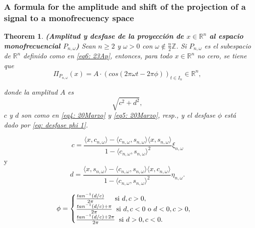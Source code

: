 \documentclass[]{beamer}
\newtheorem{teo}{\bf Theorem}
\theoremstyle{definition}
\newcommand{\IR}{\mathbb{R}}
\newcommand{\IZ}{\mathbb{Z}}
\begin{document}
\begin{frame}
\frametitle{A formula for the amplitude and shift of the projection of a signal to a monofrecuency space}
\begin{teo}
\label{teo: amelie1}
\textbf{(Amplitud y desfase de la proyección de $x \in \IR^{n}$ al
espacio monofrecuencial $P_{n, \omega}$)}
Sean $n \geq 2$ y $\omega > 0$ con $\omega \not\in \frac{n}{2}\IZ$.
Si $P_{n, \omega}$ es el subespacio de $\IR^{n}$ definido como 
en \eqref{eq6: 23Ap}, entonces, para todo 
$x \in \IR^{n}$ no cero, se tiene que
\begin{equation}
\label{ec: desfase explicito 1}
\Pi_{P_{n, \omega}} (x) = A \cdot (
cos (2 \pi \omega t - 2 \pi \phi)
)_{t \in I_{n}} \in \IR^{n},
\end{equation}

\noindent
donde la amplitud $A$ es
\[
\sqrt{c^{2}+d^{2}},
\]
$c$ y $d$ son como en \eqref{eq4: 20Marzo} y 
\eqref{eq5: 20Marzo}, resp., y el desfase $\phi$ está 
dado por \eqref{eq: desfase phi 1}.
\end{teo}
\end{frame}

\begin{frame}
\begin{equation}
\label{eq4: 20Marzo}
c= \frac{
\langle x, c_{n, \omega} \rangle - \langle c_{n, \omega}, s_{n, \omega} \rangle
\langle x, s_{n, \omega} \rangle
}{1-\langle c_{n, \omega}, s_{n, \omega} \rangle^{2}} \xi_{n, \omega}
\end{equation}
y
\begin{equation}
\label{eq5: 20Marzo}
d= \frac{
\langle x, s_{n, \omega} \rangle - \langle c_{n, \omega}, s_{n, \omega} \rangle
\langle x, c_{n, \omega} \rangle
}{1-\langle c_{n, \omega}, s_{n, \omega} \rangle^{2}} \eta_{n, \omega}.
\end{equation}
\end{frame}

\begin{frame}
\begin{equation}
\label{eq: desfase phi 1}
\phi =
\begin{cases}
\frac{tan^{-1}(d/c) }{2 \pi}  \hspace{0.4cm}    \text{   si }   d, c > 0,  \\
\frac{tan^{-1}(d/c) + \pi }{2 \pi} \hspace{0.2cm}  \text{si }  d, c < 0
\text{ o } d<0, c>0, \\
\frac{tan^{-1}(d/c) + 2\pi }{2 \pi} \hspace{0.2cm}  \text{si }  d>0,  c < 0. 
\end{cases}
\end{equation}
\end{frame}
\end{document}
